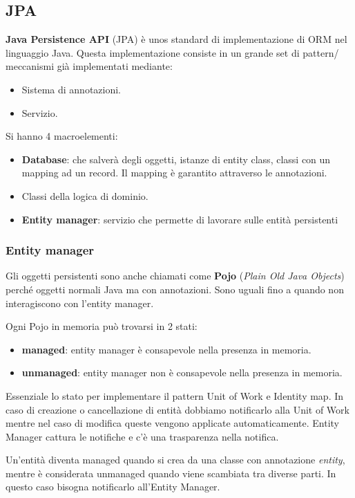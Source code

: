 \subsection{JPA}
\textbf{Java Persistence API} (JPA) è unos standard di implementazione di ORM nel
linguaggio Java. Questa implementazione consiste in un grande set di pattern/
meccanismi già implementati mediante:
\begin{itemize}
      \item Sistema di annotazioni.
      \item Servizio.
\end{itemize}
Si hanno 4 macroelementi:
\begin{itemize}
      \item \textbf{Database}: che salverà degli oggetti, istanze di entity class,
            classi con un mapping ad un record. Il mapping è garantito attraverso
            le annotazioni.
      \item Classi della logica di dominio.
      \item \textbf{Entity manager}: servizio che permette di lavorare sulle entità
            persistenti
\end{itemize}
\subsubsection{Entity manager}
Gli oggetti persistenti sono anche chiamati come \textbf{Pojo} (\textit{Plain Old
      Java Objects}) perché oggetti normali Java ma con annotazioni. Sono uguali
fino a quando non interagiscono con l'entity manager.

Ogni Pojo in memoria può trovarsi in 2 stati:
\begin{itemize}
      \item \textbf{managed}: entity manager è consapevole nella presenza in memoria.
      \item \textbf{unmanaged}: entity manager non è consapevole nella presenza
            in memoria.
\end{itemize}
Essenziale lo stato per implementare il pattern Unit of Work e Identity map.
In caso di creazione o cancellazione di entità dobbiamo notificarlo alla Unit of
Work mentre nel caso di modifica queste vengono applicate automaticamente.
Entity Manager cattura le notifiche e c'è una trasparenza nella notifica.

Un'entità diventa managed quando si crea da una classe con annotazione
\textit{entity}, mentre è considerata unmanaged quando viene scambiata tra diverse
parti. In questo caso bisogna notificarlo all'Entity Manager.

